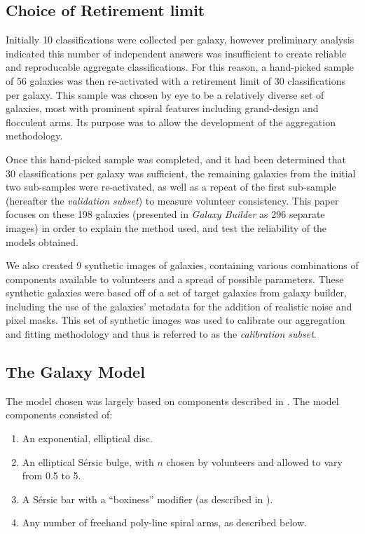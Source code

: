 \documentclass[../main.tex]{subfiles}
\begin{document}
\subsection{Choice of Retirement limit}
\label{sec:retirement-limit}

Initially 10 classifications were collected per galaxy, however preliminary analysis indicated this number of independent answers was insufficient to create reliable and reproducable aggregate classifications. For this reason, a hand-picked sample of 56 galaxies was then re-activated with a retirement limit of 30 classifications per galaxy. This sample was chosen by eye to be a relatively diverse set of galaxies, most with prominent spiral features including grand-design and flocculent arms. Its purpose was to allow the development of the aggregation methodology.

Once this hand-picked sample was completed, and it had been determined that 30 classifications per galaxy was sufficient, the remaining galaxies from the initial two sub-samples were re-activated, as well as a repeat of the first sub-sample (hereafter the \textit{validation subset}) to measure volunteer consistency. This paper focuses on these 198 galaxies (presented in \textit{Galaxy Builder} as 296 separate images) in order to explain the method used, and test the reliability of the models obtained.

We also created 9 synthetic images of galaxies, containing various combinations of components available to volunteers and a spread of possible parameters. These synthetic galaxies were based off of a set of target galaxies from galaxy builder, including the use of the galaxies' metadata for the addition of realistic noise and pixel masks. This set of synthetic images was used to calibrate our aggregation and fitting methodology and thus is referred to as the \textit{calibration subset}.

\subsection{The Galaxy Model}
\label{section:galaxy-model}

The model chosen was largely based on components described in \citet{galfit-paper}. The model components consisted of:
\begin{enumerate}
\item An exponential, elliptical disc.
\item An elliptical S\'ersic bulge, with $n$ chosen by volunteers and allowed to vary from 0.5 to 5.
\item A S\'ersic bar with a ``boxiness'' modifier (as described in \citealt{galfit-paper}).
\item Any number of freehand poly-line spiral arms, as described below.
\end{enumerate}
\end{document}
